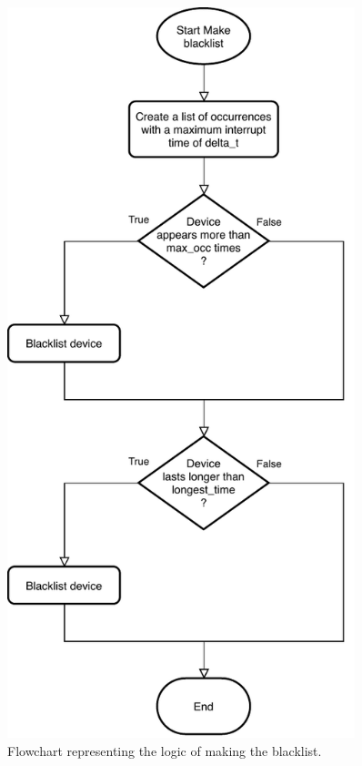 \begin{figure}
\begin{minipage}[b]{8.5cm}
\centering
\includegraphics[width=0.9\textwidth]{images/flowblacklist}
\caption{Flowchart representing the logic of making the blacklist.}
\label{fig:flowblacklist}
\end{minipage}
\end{figure}

